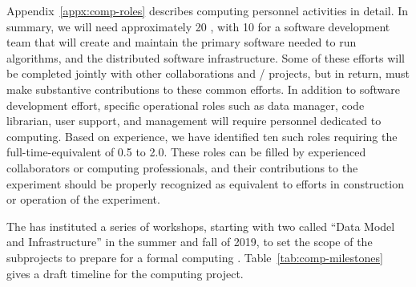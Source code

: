 Appendix~\ref{appx:comp-roles} describes computing personnel activities in detail.  In summary, we will need approximately 20 , with 10  for a software development team that will create and maintain the primary software needed to run  algorithms, and the distributed software infrastructure.  Some of these efforts will be completed jointly with other collaborations and / projects, but in return,  must make substantive contributions to these common efforts. In addition to software development effort,  
specific operational roles such as data manager, code librarian, user support, and management %
will require personnel dedicated to  computing. Based on  experience, we have identified ten such roles 
requiring the full-time-equivalent  of 0.5 to 2.0.  These roles can be filled by experienced  collaborators or computing professionals, and their contributions to the experiment should be properly recognized as equivalent to efforts in construction or operation of the experiment. 

The  has instituted a series of workshops, starting with two called ``Data Model and Infrastructure'' in the summer and fall of 2019, to set the scope of the subprojects to prepare for a formal computing . Table~\ref{tab:comp-milestones} gives a draft timeline for the computing project.

